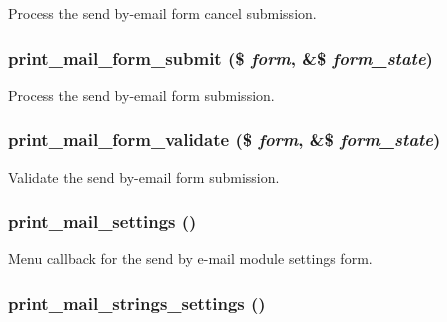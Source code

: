Process the send by-email form cancel submission. \hypertarget{group__forms_g7246132b43dcb17338c06d0514cee450}{
\subsubsection[{print\_\-mail\_\-form\_\-submit}]{\setlength{\rightskip}{0pt plus 5cm}print\_\-mail\_\-form\_\-submit (\$ {\em form}, \/  \&\$ {\em form\_\-state})}}
\label{group__forms_g7246132b43dcb17338c06d0514cee450}


Process the send by-email form submission. \hypertarget{group__forms_ga2d6456473de55b23efba0e78f45a2ac}{
\subsubsection[{print\_\-mail\_\-form\_\-validate}]{\setlength{\rightskip}{0pt plus 5cm}print\_\-mail\_\-form\_\-validate (\$ {\em form}, \/  \&\$ {\em form\_\-state})}}
\label{group__forms_ga2d6456473de55b23efba0e78f45a2ac}


Validate the send by-email form submission. \hypertarget{group__forms_gb3489dff3d2771599274bed287d0094e}{
\subsubsection[{print\_\-mail\_\-settings}]{\setlength{\rightskip}{0pt plus 5cm}print\_\-mail\_\-settings ()}}
\label{group__forms_gb3489dff3d2771599274bed287d0094e}


Menu callback for the send by e-mail module settings form. \hypertarget{group__forms_gf73e954e3100496d07d88525e9349ca6}{
\subsubsection[{print\_\-mail\_\-strings\_\-settings}]{\setlength{\rightskip}{0pt plus 5cm}print\_\-mail\_\-strings\_\-settings ()}}
\label{group__forms_gf73e954e3100496d07d88525e9349ca6}



